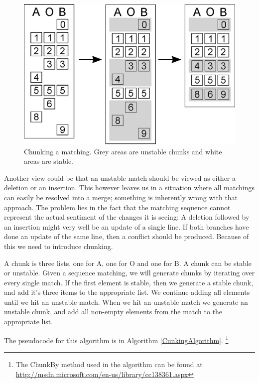 \documentclass[11pt]{article}
\begin{document}
\begin{figure}
   \centerline{\includegraphics[scale=0.4]{drawings/eps/threewaymatching-chunking.eps}}
   \caption{Chunking a matching. Grey areas are unstable chunks and white areas are stable.}
   \label{Chunking}
\end{figure}

Another view could be that an unstable match should be viewed as either a deletion or an insertion. This however leaves us in a situation where all matchings can easily be resolved into a merge; something is inherently wrong with that approach. The problem lies in the fact that the matching sequence cannot represent the actual sentiment of the changes it is seeing: A deletion followed by an insertion might very well be an update of a single line. If both branches have done an update of the same line, then a conflict should be produced. Because of this we need to introduce chunking.

A chunk is three lists, one for A, one for O and one for B. A chunk can be stable or unstable. Given a sequence matching, we will generate chunks by iterating over every single match. If the first element is stable, then we generate a stable chunk, and add it's three items to the appropriate list. We continue adding all elements until we hit an unstable match. When we hit an unstable match we generate an unstable chunk, and add all non-empty elements from the match to the appropriate list.

The pseudocode for this algorithm is in Algorithm \ref{CunkingAlgorithm}. \footnote{The ChunkBy method used in the algorithm can be found at \url{http://msdn.microsoft.com/en-us/library/cc138361.aspx}}
\end{document}
